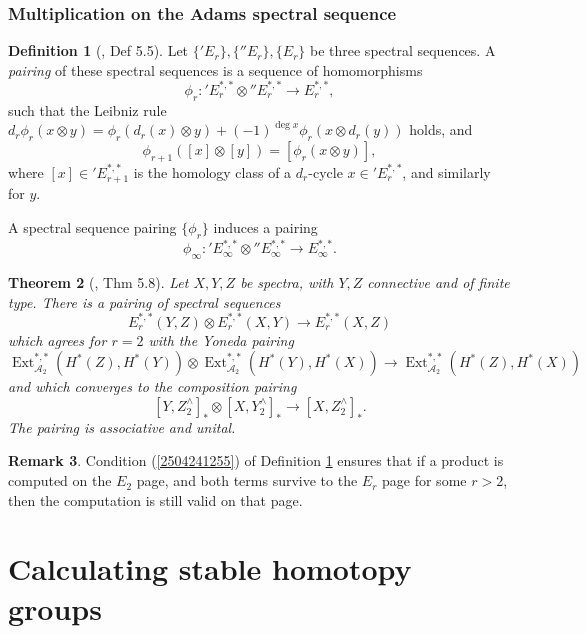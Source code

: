 \documentclass[11pt, titlepage]{article} %
\def\A{\ensuremath{\mathscr{A}_2}}
\DeclareMathOperator{\Ext}{Ext}
\numberwithin{equation}{subsection}
\theoremstyle{plain}
\newtheorem{theorem}{Theorem}[subsection]
\theoremstyle{definition}
\newtheorem{definition}[theorem]{Definition}
\newtheorem{remark}[theorem]{Remark}
\begin{document}
\subsubsection{Multiplication on the Adams spectral sequence}

\begin{definition}[{\autocite{ass}, Def 5.5}]\label{2504241258}
Let \(\{'E_r\}, \{''E_r\}, \{E_r\}\) be three spectral sequences. A \textit{pairing} of these spectral sequences is a sequence of homomorphisms 
\[\phi_r : \text{}'E_r^{*,*}\otimes \text{}''E_r^{*,*} \to E_r^{*,*},\]
such that the Leibniz rule \(d_r\phi_r(x\otimes y)=\phi_r(d_r(x)\otimes y)+(-1)^{\deg x}\phi_r(x\otimes d_r(y))\) holds, and
\begin{equation}\label{2504241255}
\phi_{r+1}([x]\otimes[y])=[\phi_r(x\otimes y)],
\end{equation}
where \([x]\in \text{}'E_{r+1}^{*,*}\) is the homology class of a \(d_r\)-cycle \(x\in \text{}'E_r^{*,*}\), and similarly for \(y\).
\end{definition}

A spectral sequence pairing \(\{\phi_r\}\) induces a pairing 
\[\phi_\infty : \text{}'E_\infty^{*,*}\otimes \text{}''E^{*,*}_\infty \to E^{*,*}_\infty.\]

\begin{theorem}[{\autocite{ass}, Thm 5.8}]
Let \(X,Y,Z\) be spectra, with \(Y, Z\) connective and of finite type. There is a pairing of spectral sequences
\[E^{*,*}_r(Y,Z)\otimes E^{*,*}_r(X,Y)\to E^{*,*}_r(X,Z)\]
which agrees for \(r=2\) with the Yoneda pairing
\[\Ext^{*,*}_{\A}(H^*(Z), H^*(Y))\otimes \Ext_{\A}^{*,*}(H^*(Y), H^*(X))\to \Ext_{\A}^{*,*}(H^*(Z), H^*(X))\]
and which converges to the composition pairing
\[[Y, Z^\wedge_2]_*\otimes [X,Y^\wedge_2]_* \to [X, Z^\wedge_2]_*.\]
The pairing is associative and unital.
\end{theorem}

\begin{remark}
Condition (\ref{2504241255}) of Definition \ref{2504241258} ensures that if a product is computed on the \(E_2\) page, and both terms survive to the \(E_r\) page for some \(r>2\), then the computation is still valid on that page.
\end{remark}

\section{Calculating stable homotopy groups}
\end{document}
